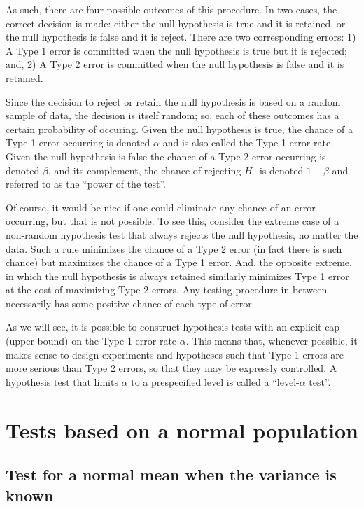 \documentclass[
]{book}
\begin{document}
As such, there are four possible outcomes of this procedure. In two cases, the correct decision is made: either the null hypothesis is true and it is retained, or the null hypothesis is false and it is reject. There are two corresponding errors:
1) A Type 1 error is committed when the null hypothesis is true but it is rejected; and,
2) A Type 2 error is committed when the null hypothesis is false and it is retained.

Since the decision to reject or retain the null hypothesis is based on a random sample of data, the decision is itself random; so, each of these outcomes has a certain probability of occuring. Given the null hypothesis is true, the chance of a Type 1 error occurring is denoted \(\alpha\) and is also called the Type 1 error rate. Given the null hypothesis is false the chance of a Type 2 error occurring is denoted \(\beta\), and its complement, the chance of rejecting \(H_0\) is denoted \(1-\beta\) and referred to as the ``power of the test''.

Of course, it would be nice if one could eliminate any chance of an error occurring, but that is not possible. To see this, consider the extreme case of a non-random hypothesis test that always rejects the null hypothesis, no matter the data. Such a rule minimizes the chance of a Type 2 error (in fact there is such chance) but maximizes the chance of a Type 1 error. And, the opposite extreme, in which the null hypothesis is always retained similarly minimizes Type 1 error at the cost of maximizing Type 2 errors. Any testing procedure in between necessarily has some positive chance of each type of error.

As we will see, it is possible to construct hypothesis tests with an explicit cap (upper bound) on the Type 1 error rate \(\alpha\). This means that, whenever possible, it makes sense to design experiments and hypotheses such that Type 1 errors are more serious than Type 2 errors, so that they may be expressly controlled. A hypothesis test that limits \(\alpha\) to a prespecified level is called a ``level-\(\alpha\) test''.

\hypertarget{tests-based-on-a-normal-population}{%
\section{Tests based on a normal population}\label{tests-based-on-a-normal-population}}

\hypertarget{test-for-a-normal-mean-when-the-variance-is-known}{%
\subsection{Test for a normal mean when the variance is known}\label{test-for-a-normal-mean-when-the-variance-is-known}}
\end{document}
